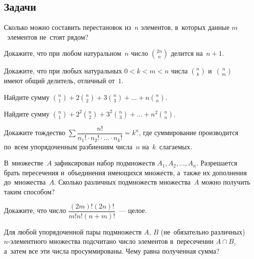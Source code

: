 \subsection*{Задачи}

\begin{problems}

\item
Сколько можно составить перестановок из~$n$ элементов, в~которых данные
$m$~элементов не~стоят рядом?

\item
Докажите, что при любом натуральном~$n$ число $\binom{2n}{n}$ делится на~$n + 1$.

\item
Докажите, что при любых натуральных $0 < k < m < n$ числа
$\binom{n}{k}$ и~$\binom{n}{m}$ имеют общий делитель, отличный от~$1$.

\item
Найдите сумму
\(
    \binom{n}{1} + 2 \binom{n}{2} + 3 \binom{n}{3}
    + \ldots +
    n \binom{n}{n}
\).

\item
Найдите сумму
\(
    \binom{n}{1} + 2^{2} \binom{n}{2} + 3^{2} \binom{n}{3}
    + \ldots +
    n^{2} \binom{n}{n}
\).

\item
Докажите тождество
\(
    \sum
        \dfrac{n!}{n_{1}! \cdot n_{2}! \cdot \ldots \cdot n_{k}!}
=
    k^{n}
\),
где суммирование производится по~всем упорядоченным разбиениям числа~$n$
на~$k$~слагаемых.

\item
В~множестве~$A$ зафиксирован набор подмножеств $A_{1}, A_{2}, \ldots, A_{n}$.
Разрешается брать пересечения и~объединения имеющихся множеств, а~также их
дополнения до~множества~$A$.
Сколько различных подмножеств множества~$A$ можно получить таким способом?

\item
Докажите, что число $\dfrac{(2m)!(2n)!}{m!n!(n+m)!}$~--- целое.

\item
Для любой упорядоченной пары подмножеств $A$, $B$ (не~обязательно различных)
$n$-эле\-ментного множества подсчитано число элементов
в~пересечении $A \cap B$, а~затем все эти числа просуммированы.
Чему равна полученная сумма?

\end{problems}

\endgroup %

